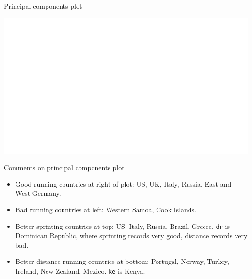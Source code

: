 \begin{frame}{Principal components plot}

\begin{knitrout}
\color{fgcolor}
\includegraphics[width=\maxwidth]{figure/lecce-1} 

\end{knitrout}

  
\end{frame}

\begin{frame}[fragile]{Comments on principal components plot}
  
  \begin{itemize}
  \item Good running countries at right of plot: US, UK, Italy,
    Russia, East and West Germany.
  \item Bad running countries at left: Western Samoa, Cook Islands.
  \item Better sprinting countries at top: US, Italy, Russia,
    Brazil, Greece. \texttt{dr} is Dominican Republic, where sprinting
    records very good, distance records very bad.
  \item Better distance-running countries at bottom: Portugal, Norway,
    Turkey, Ireland, New Zealand, Mexico. \texttt{ke} is Kenya.
  \end{itemize}
  
\end{frame}

